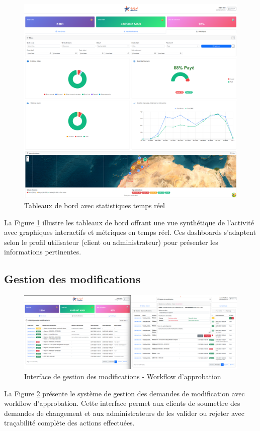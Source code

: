 \begin{figure}[H]
\centering
\includegraphics[width=1.0\textwidth]{images/dashboard_interface.png}
\caption{Tableaux de bord avec statistiques temps réel}
\label{fig:dashboard_interface}
\end{figure}

La Figure \ref{fig:dashboard_interface} illustre les tableaux de bord offrant une vue synthétique de l'activité avec graphiques interactifs et métriques en temps réel. Ces dashboards s'adaptent selon le profil utilisateur (client ou administrateur) pour présenter les informations pertinentes.

\subsection{Gestion des modifications}

\begin{figure}[H]
\centering
\includegraphics[width=1.0\textwidth]{images/modifications_workflow.png}
\caption{Interface de gestion des modifications - Workflow d'approbation}
\label{fig:modifications_workflow}
\end{figure}
La Figure \ref{fig:modifications_workflow} présente le système de gestion des demandes de modification avec workflow d'approbation. Cette interface permet aux clients de soumettre des demandes de changement et aux administrateurs de les valider ou rejeter avec traçabilité complète des actions effectuées.

